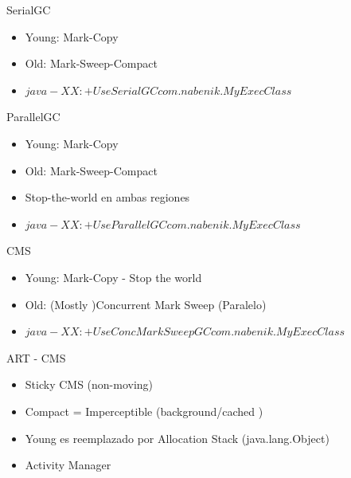 \documentclass{beamer}
\begin{document}
\begin{frame}[fragile]{SerialGC}
\begin{itemize}
	\item Young: Mark-Copy
	\item Old: Mark-Sweep-Compact
	\item $java -XX:+UseSerialGC com.nabenik.MyExecClass$
\end{itemize}
\end{frame}

\begin{frame}[fragile]{ParallelGC}
\begin{itemize}
	\item Young: Mark-Copy
	\item Old: Mark-Sweep-Compact
	\item Stop-the-world en ambas regiones
	\item $java -XX:+UseParallelGC com.nabenik.MyExecClass$
\end{itemize}
\end{frame}

\begin{frame}[fragile]{CMS}
\begin{itemize}
	\item Young: Mark-Copy - Stop the world
	\item Old: (Mostly )Concurrent Mark Sweep (Paralelo)
	\item $java -XX:+UseConcMarkSweepGC com.nabenik.MyExecClass$
\end{itemize}
\end{frame}

\begin{frame}[fragile]{ART - CMS}
\begin{itemize}
	\item Sticky CMS (non-moving)
	\item Compact = Imperceptible (background/cached )
	\item Young es reemplazado por Allocation Stack (java.lang.Object)
	\item Activity Manager
\end{itemize}
\end{frame}
\end{document}
